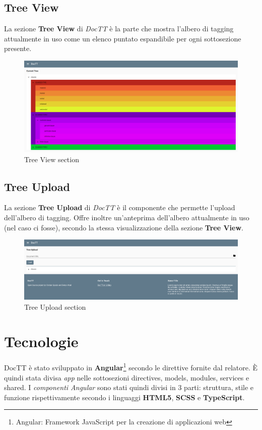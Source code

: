 \documentclass[twoside]{supsistudent}
\begin{document}
\subsection{Tree View}
La sezione \textbf{Tree View} di \textit{DocTT} è la parte che mostra l'albero
di tagging attualmente in uso come un elenco puntato espandibile per ogni
sottosezione presente.

\begin{figure}[h!]
  \includegraphics[width=\linewidth]{figures/treeView.png}
  \caption{Tree View section}\label{fig:treeView}
\end{figure}

\pagebreak

\subsection{Tree Upload}
La sezione \textbf{Tree Upload} di \textit{DocTT} è il componente che permette
l'upload dell'albero di tagging. Offre inoltre un'anteprima dell'albero 
attualmente in uso (nel caso ci fosse), secondo la stessa visualizzazione 
della sezione \textbf{Tree View}.
 
\begin{figure}[h!]
  \includegraphics[width=\linewidth]{figures/treeUpload.png}
  \caption{Tree Upload section}\label{fig:treeUpload}
\end{figure}

\section{Tecnologie}
DocTT è stato sviluppato in \textbf{Angular}\footnote{Angular: Framework 
		JavaScript per la creazione di applicazioni web} secondo le direttive 
fornite dal relatore. È quindi stata divisa \textit{app} nelle sottosezioni 
directives, models, modules, services e shared. I \textit{componenti Angular} 
sono stati quindi divisi in 3 parti: struttura, stile e funzione 
rispettivamente secondo i linguaggi \textbf{HTML5}, 
\textbf{SCSS} e \textbf{TypeScript}.
\end{document}
